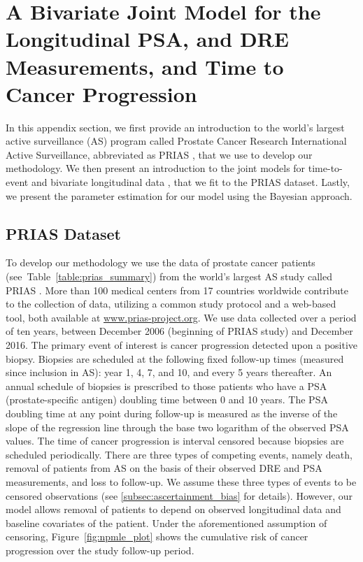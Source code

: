 \section{A Bivariate Joint Model for the Longitudinal PSA, and DRE Measurements, and Time to Cancer Progression}
\label{sec:jm_framework}

In this appendix section, we first provide an introduction to the world's largest active surveillance (AS) program called Prostate Cancer Research International Active Surveillance, abbreviated as PRIAS \citep{bokhorst2016decade}, that we use to develop our methodology. We then present an introduction to the joint models for time-to-event and bivariate longitudinal data \citep{tsiatis2004joint,rizopoulos2012joint}, that we fit to the PRIAS dataset. Lastly, we present the parameter estimation for our model using the Bayesian approach. 

\subsection{PRIAS Dataset}
To develop our methodology we use the data of prostate cancer patients (see~Table~\ref{table:prias_summary}) from the world's largest AS study called PRIAS \citep{bokhorst2016decade}. More than 100 medical centers from 17 countries worldwide contribute to the collection of data, utilizing a common study protocol and a web-based tool, both available at \url{www.prias-project.org}. We use data collected over a period of ten years, between December 2006 (beginning of PRIAS study) and December 2016. The primary event of interest is cancer progression detected upon a positive biopsy. Biopsies are scheduled at the following fixed follow-up times (measured since inclusion in AS): year 1, 4, 7, and 10, and every 5 years thereafter. An annual schedule of biopsies is prescribed to those patients who have a PSA (prostate-specific antigen) doubling time between 0 and 10 years. The PSA doubling time at any point during follow-up is measured as the inverse of the slope of the regression line through the base two logarithm of the observed PSA values. The time of cancer progression is interval censored because biopsies are scheduled periodically. There are three types of competing events, namely death, removal of patients from AS on the basis of their observed DRE and PSA measurements, and loss to follow-up. We assume these three types of events to be censored observations (see \ref{subsec:ascertainment_bias} for details). However, our model allows removal of patients to depend on observed longitudinal data and baseline covariates of the patient. Under the aforementioned assumption of censoring, Figure~\ref{fig:npmle_plot} shows the cumulative risk of cancer progression over the study follow-up period.

